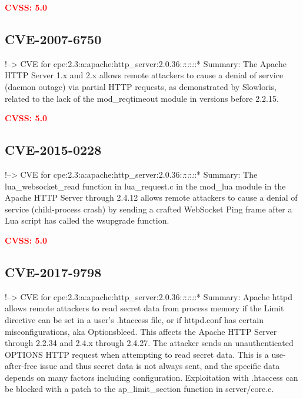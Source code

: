 \documentclass[a4paper, 12pt]{article}
\begin{document}
\textbf{\textcolor{red}{CVSS: 5.0}}

\hypertarget{cve-2007-6750}{%
\subsection{CVE-2007-6750}\label{cve-2007-6750}}

!--\textgreater{} CVE for
cpe:2.3:a:apache:http\_server:2.0.36:\emph{:}:\emph{:}:\emph{:}:*
Summary: The Apache HTTP Server 1.x and 2.x allows remote attackers to
cause a denial of service (daemon outage) via partial HTTP requests, as
demonstrated by Slowloris, related to the lack of the mod\_reqtimeout
module in versions before 2.2.15.

\textbf{\textcolor{red}{CVSS: 5.0}}

\hypertarget{cve-2015-0228}{%
\subsection{CVE-2015-0228}\label{cve-2015-0228}}

!--\textgreater{} CVE for
cpe:2.3:a:apache:http\_server:2.0.36:\emph{:}:\emph{:}:\emph{:}:*
Summary: The lua\_websocket\_read function in lua\_request.c in the
mod\_lua module in the Apache HTTP Server through 2.4.12 allows remote
attackers to cause a denial of service (child-process crash) by sending
a crafted WebSocket Ping frame after a Lua script has called the
wsupgrade function.

\textbf{\textcolor{red}{CVSS: 5.0}}

\hypertarget{cve-2017-9798}{%
\subsection{CVE-2017-9798}\label{cve-2017-9798}}

!--\textgreater{} CVE for
cpe:2.3:a:apache:http\_server:2.0.36:\emph{:}:\emph{:}:\emph{:}:*
Summary: Apache httpd allows remote attackers to read secret data from
process memory if the Limit directive can be set in a user's .htaccess
file, or if httpd.conf has certain misconfigurations, aka Optionsbleed.
This affects the Apache HTTP Server through 2.2.34 and 2.4.x through
2.4.27. The attacker sends an unauthenticated OPTIONS HTTP request when
attempting to read secret data. This is a use-after-free issue and thus
secret data is not always sent, and the specific data depends on many
factors including configuration. Exploitation with .htaccess can be
blocked with a patch to the ap\_limit\_section function in
server/core.c.
\end{document}
